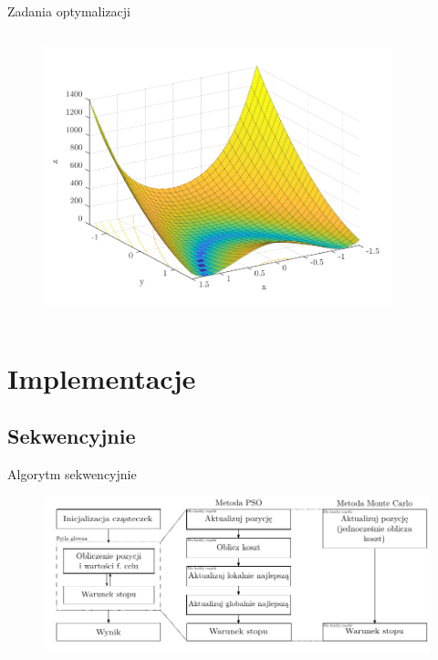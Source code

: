 \documentclass[handout]{beamer}
\begin{document}
\begin{frame}{Zadania optymalizacji}
\begin{columns}
\begin{column}[t]{0.5\textwidth}
\vspace{-.3cm}

\begin{figure}[t]
\includegraphics[width=0.9\textwidth]{grafiki/zad_2.pdf}
\end{figure}

\end{column}
\end{columns}
\end{frame}




\section{Implementacje}
\subsection{Sekwencyjnie}

\begin{frame}{Algorytm sekwencyjnie}
\begin{figure}[t]
\includegraphics[width=1\textwidth]{grafiki/alg_szczegolowy.pdf}
\end{figure}
\end{frame}
\end{document}
